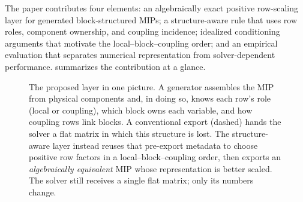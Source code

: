 \documentclass[AMA,Times1COL]{WileyNJDv5} %
\providecommand{\DIFadd}[1]{{\protect\color{blue} \sf #1}} %
\providecommand{\DIFaddbegin}{} %
\providecommand{\DIFaddFL}[1]{\DIFadd{#1}} %
\begin{document}
The \DIFaddbegin \DIFadd{paper contributes four elements: an algebraically exact positive row-scaling layer for
generated block-structured MIPs; a structure-aware rule that uses row roles, component
ownership, and coupling incidence; idealized conditioning arguments that motivate the
local--block--coupling order; and an empirical evaluation that separates numerical
representation from solver-dependent performance. \Cref{fig:overview} summarizes the
contribution at a glance.
}

\begin{figure}[t]
\centering
{}
\caption{\DIFaddFL{The proposed layer in one picture. A generator assembles the MIP from physical
components and, in doing so, knows each row's role (local or coupling), which block owns
each variable, and how coupling rows link blocks. A conventional export (dashed) hands the
solver a flat matrix in which this structure is lost. The structure-aware layer instead
reuses that pre-export metadata to choose positive row factors in a local--block--coupling
order, then exports an \emph{algebraically equivalent} MIP whose representation is better
scaled. The solver still receives a single flat matrix; only its numbers change.}}
\label{fig:overview}
\end{figure}
\end{document}
